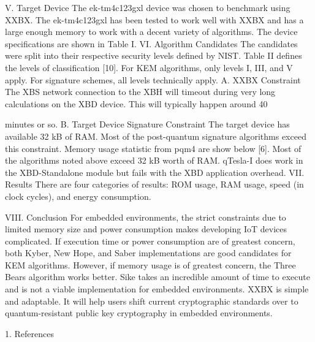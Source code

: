V. Target Device
The ek-tm4c123gxl device was chosen to benchmark using XXBX. The ek-tm4c123gxl has been tested to work well with XXBX and has a large enough memory to work with a decent
variety of algorithms. The device specifications are shown in Table I.
VI. Algorithm Candidates
The candidates were split into their respective security levels defined by NIST. Table II defines the levels of classification [10].
For KEM algorithms, only levels I, III, and V apply. For signature schemes, all levels technically apply.
A. XXBX Constraint
The XBS network connection to the XBH will timeout during very long calculations on the XBD device. This will typically happen around 40 

minutes or so.
B. Target Device Signature Constraint
The target device has available 32 kB of RAM. Most of the post-quantum signature algorithms exceed this constraint. Memory usage statistic from pqm4 are show below [6].
Most of the algorithms noted above exceed 32 kB worth of RAM. qTesla-I does work in the XBD-Standalone module but fails with the XBD application overhead.
VII. Results
There are four categories of results: ROM usage, RAM usage, speed (in clock cycles), and energy consumption.

VIII. Conclusion
For embedded environments, the strict constraints due to limited memory size and power consumption makes developing IoT devices complicated. If execution time or power consumption are of greatest concern, both Kyber, New Hope, and Saber implementations are good candidates for KEM algorithms. However, if memory usage is of greatest concern, the Three Bears algorithm works better.
Sike takes an incredible amount of time to execute and is not a viable implementation for embedded environments.
XXBX is simple and adaptable. It will help users shift current cryptographic standards over to quantum-resistant public key cryptography in embedded environments.

1. References
